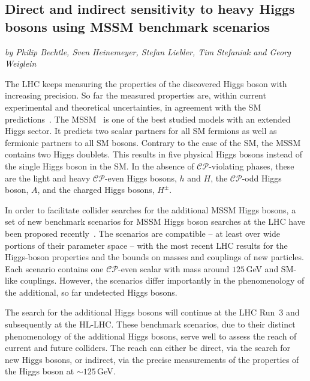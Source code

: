 \subsection{Direct and indirect sensitivity to heavy Higgs bosons using MSSM benchmark scenarios}\label{Sec:9.5}
\begin{center}
\textit{by Philip Bechtle, Sven Heinemeyer, Stefan Liebler, Tim Stefaniak and Georg Weiglein}
\end{center}


The LHC keeps measuring the properties of the discovered Higgs boson with increasing precision. So far the measured properties are, within current experimental and theoretical uncertainties, in agreement with the SM predictions~\cite{Khachatryan:2016vau}. The MSSM~\cite{Nilles:1983ge,Haber:1984rc,Gunion:1984yn} is one of the best studied models with an extended Higgs sector. It predicts two scalar partners for all SM fermions as well as fermionic partners to all SM bosons. Contrary to the case of the SM, the MSSM contains two Higgs doublets.
This results in five physical Higgs bosons instead of the single Higgs boson in the SM. In the absence of $\mathcal{CP}$-violating phases, these are the light and heavy $\mathcal{CP}$-even Higgs bosons,  
$h$ and $H$, the $\mathcal{CP}$-odd Higgs boson, $A$, and the charged Higgs bosons, $H^\pm$.

In order to facilitate collider searches for the additional MSSM Higgs bosons, a set of new benchmark scenarios for MSSM Higgs boson searches at the LHC have been proposed recently~\cite{Bahl:2018zmf}. The scenarios are compatible -- at least over wide portions
of their parameter space -- with the most recent LHC results for the
Higgs-boson properties and the bounds on masses and couplings of new
particles. Each scenario contains one $\mathcal{CP}$-even scalar with mass around $125$\,GeV and SM-like couplings. However, the scenarios differ importantly in the phenomenology of the additional, so far undetected Higgs bosons.

The search for the additional Higgs bosons will continue at the LHC
Run~3 and subsequently at the HL-LHC. These benchmark scenarios, due to their distinct phenomenology of the additional Higgs bosons, serve well to assess the reach of current and future colliders. The reach can either be direct, via the search for new Higgs bosons, or indirect, via the precise measurements of the properties of the Higgs boson at $\sim 125$\,GeV. 

